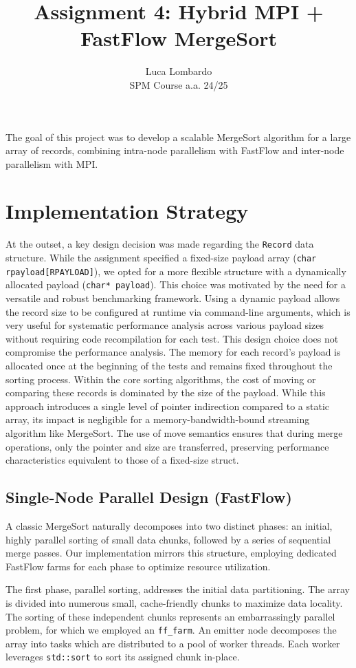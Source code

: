 \documentclass[10pt]{article}
\title{Assignment 4: Hybrid MPI + FastFlow MergeSort}
\author{Luca Lombardo \\ SPM Course a.a. 24/25}
\date{}
\newcommand{\code}[1]{\texttt{#1}}
\begin{document}
\maketitle


The goal of this project was to develop a scalable MergeSort algorithm for a large array of records, combining intra-node parallelism with FastFlow and inter-node parallelism with MPI.
\section{Implementation Strategy}

At the outset, a key design decision was made regarding the \code{Record} data structure. While the assignment specified a fixed-size payload array (\code{char rpayload[RPAYLOAD]}), we opted for a more flexible structure with a dynamically allocated payload (\code{char* payload}). This choice was motivated by the need for a versatile and robust benchmarking framework. Using a dynamic payload allows the record size to be configured at runtime via command-line arguments, which is very useful for systematic performance analysis across various payload sizes without requiring code recompilation for each test. This design choice does not compromise the performance analysis. The memory for each record's payload is allocated once at the beginning of the tests and remains fixed throughout the sorting process. Within the core sorting algorithms, the cost of moving or comparing these records is dominated by the size of the payload. While this approach introduces a single level of pointer indirection compared to a static array, its impact is negligible for a memory-bandwidth-bound streaming algorithm like MergeSort. The use of move semantics ensures that during merge operations, only the pointer and size are transferred, preserving performance characteristics equivalent to those of a fixed-size struct.

\subsection{Single-Node Parallel Design (FastFlow)}
A classic MergeSort naturally decomposes into two distinct phases: an initial, highly parallel sorting of small data chunks, followed by a series of sequential merge passes. Our implementation mirrors this structure, employing dedicated FastFlow farms for each phase to optimize resource utilization.

The first phase, parallel sorting, addresses the initial data partitioning. The array is divided into numerous small, cache-friendly chunks to maximize data locality. The sorting of these independent chunks represents an embarrassingly parallel problem, for which we employed an \code{ff\_farm}. An emitter node decomposes the array into tasks which are distributed to a pool of worker threads. Each worker leverages \code{std::sort} to sort its assigned chunk in-place.
\end{document}
